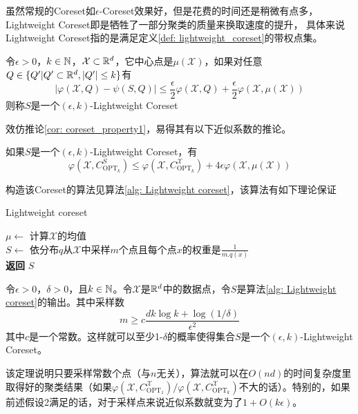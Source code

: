虽然常规的Coreset如$\epsilon$-Coreset效果好，但是花费的时间还是稍微有点多，Lightweight Coreset即是牺牲了一部分聚类的质量来换取速度的提升， 具体来说Lightweight Coreset指的是满足定义\ref{def: lightweight_coreset}的带权点集。
\begin{definition}
    \label{def: lightweight_coreset}
    令$\epsilon > 0$，$k \in \mathbb{N}$，$\mathcal{X} \subset \mathbb{R}^d$，它中心点是$\mu(\mathcal{X})$，如果对任意$Q \in \{Q'| Q' \subset \mathbb{R}^d, |Q'| \leq k\}$有
    \begin{equation}
        |\varphi(\mathcal{X},Q) - \psi(S,Q)| \leq \frac{\epsilon}{2}\varphi(\mathcal{X},Q) + \frac{\epsilon}{2}\varphi(\mathcal{X},\mu(\mathcal{X}))
    \end{equation}
    则称$S$是一个$(\epsilon,k)$-Lightweight Coreset
\end{definition}
效仿推论\ref{cor: coreset_property1}，易得其有以下近似系数的推论。
\begin{corollary}
    如果$S$是一个$(\epsilon,k)$-Lightweight Coreset，有
    \begin{equation}
        \varphi(\mathcal{X},C_{\text{OPT}_k}^S) \leq \varphi(\mathcal{X},C_{\text{OPT}_k}^{\mathcal{X}}) + 4\epsilon\varphi(\mathcal{X},\mu(\mathcal{X}))
    \end{equation}
\end{corollary}
构造该Coreset的算法见算法\ref{alg: Lightweight coreset}，该算法有如下理论保证
\begin{algorithm}
    \caption{Lightweight coreset}\label{alg: Lightweight coreset}
    $\mu \gets$ 计算$\mathcal{X}$的均值 \\
    $S \gets $ 依分布$q$从$\mathcal{X}$中采样$m$个点且每个点$x$的权重是$\frac{1}{m.q(x)}$ \\
    \textbf{返回} $S$
\end{algorithm}
\begin{theorem}
    \label{theo: lightweight_coreset}
    令$\epsilon>0$，$\delta>0$，且$k\in \mathbb{N}$。令$\mathcal{X}$是$\mathbb{R}^d$中的数据点，令$S$是算法\ref{alg: Lightweight coreset}的输出。其中采样数
    \begin{equation}
        m \geq c\frac{dk\log k + \log(1/\delta)}{\epsilon^2}
    \end{equation}
    其中$c$是一个常数。这样就可以至少1-$\delta$的概率使得集合$S$是一个$(\epsilon,k)$-Lightweight Coreset。
\end{theorem}
该定理说明只要采样常数个点（与$n$无关），算法就可以在$O(nd)$的时间复杂度里取得好的聚类结果（如果$\varphi(\mathcal{X},C_{\text{OPT}_1}^{\mathcal{X}})/\varphi(\mathcal{X},C_{\text{OPT}_k}^{\mathcal{X}})$不大的话）。特别的，如果前述假设2满足的话，对于采样点来说近似系数就变为了$1+O(k\epsilon)$。%

